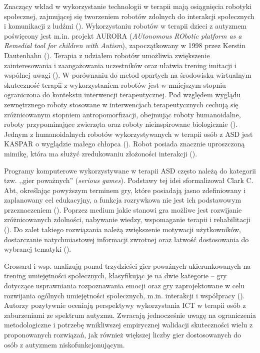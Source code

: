     Znaczący wkład w wykorzystanie technologii w terapii mają osiągnięcia robotyki społecznej, zajmującej się tworzeniem robotów zdolnych do interakcji społecznych i komunikacji z ludźmi (\cite{breazeal2004designing}).
    Wykorzystaniu robotów w terapii dzieci z autyzmem poświęcony jest m.in. projekt AURORA (\emph{AUtonomous RObotic platform as a Remedial tool for children with Autism}), zapoczątkowany w 1998 przez Kerstin Dautenhahn (\cite{dautenhahn1999robots}).
    Terapia z udziałem robotów umożliwia zwiększenie zainteresowania i zaangażowania uczestników oraz ułatwia trening imitacji i wspólnej uwagi (\cite{boucenna2014interactive}).
    W porównaniu do metod opartych na środowisku wirtualnym skuteczność terapii z wykorzystaniem robotów jest w mniejszym stopniu ograniczona do kontekstu interwencji terapeutycznej.
    Pod względem wyglądu zewnętrznego roboty stosowane w interwencjach terapeutycznych cechują się zróżnicowanym stopniem antropomorfizacji, obejmując roboty humanoidalne, roboty przypominające zwierzęta oraz roboty nieinspirowane biologicznie (\cite{scassellati2012robots}).
    Jednym z humanoidalnych robotów wykorzystywanych w terapii osób z ASD jest KASPAR o wyglądzie małego chłopca (\cite{dautenhahn2009kaspar}).
    Robot posiada znacznie uproszczoną mimikę, która ma służyć zredukowaniu złożoności interakcji (\cite{robins2009isolation}).
    
    Programy komputerowe wykorzystywane w terapii ASD często należą do kategorii tzw. ,,gier poważnych'' (\emph{serious games}).
    Podstawy tej idei sformalizował Clark C. Abt, określając powyższym terminem gry, które posiadają jasno zdefiniowany i zaplanowany cel edukacyjny, a funkcja rozrywkowa nie jest ich podstawowym przeznaczeniem (\cite{abt1987serious}). 
    Poprzez medium jakie stanowi gra możliwe jest rozwijanie zróżnicowanych zdolności, nabywanie wiedzy, wspomaganie terapii i rehabilitacji (\cite{michael2005serious}). %
    Do zalet takiego rozwiązania należą zwiększenie motywacji użytkowników, dostarczanie natychmiastowej informacji zwrotnej oraz łatwość dostosowania do wybranej tematyki (\cite{ritterfeld2009serious}).
    
    Grossard i wsp. analizują ponad trzydzieści gier poważnych ukierunkowanych na trening umiejętności społecznych, klasyfikując je na dwie kategorie -- gry dotyczące usprawniania rozpoznawania emocji oraz gry zaprojektowane w celu rozwijania ogólnych umiejętności społecznych, m.in. interakcji i współpracy (\cite{grossard2017serious}).
    Autorzy pozytywnie oceniają perspektywy wykorzystania ICT w terapii osób z zaburzeniami ze spektrum autyzmu.
    Zwracają jednocześnie uwagę na ograniczenia metodologiczne i potrzebę wnikliwszej empirycznej walidacji skuteczności wielu z proponowanych rozwiązań, jak również większej liczby gier dostosowanych do osób z autyzmem niskofunkcjonującym.
    
